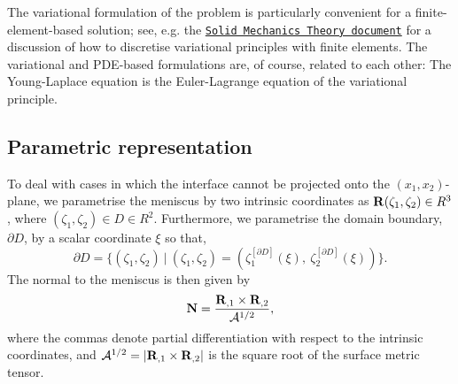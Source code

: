 The variational formulation of the problem is particularly convenient for a finite-\/element-\/based solution; see, e.\+g. the \href{../../../solid/solid_theory/html/index.html#CartesianLagrangian}{\tt Solid Mechanics Theory document} for a discussion of how to discretise variational principles with finite elements. The variational and P\+D\+E-\/based formulations are, of course, related to each other\+: The Young-\/\+Laplace equation is the Euler-\/\+Lagrange equation of the variational principle.\hypertarget{index_intrinsic}{}\subsection{Parametric representation}\label{index_intrinsic}
To deal with cases in which the interface cannot be projected onto the $ (x_1, x_2) $-\/plane, we parametrise the meniscus by two intrinsic coordinates as $ {\bf R}(\zeta_1,\zeta_2) \in { R}^3$, where $(\zeta_1,\zeta_2) \in D \in { R}^2$. Furthermore, we parametrise the domain boundary, $\partial D$, by a scalar coordinate $\xi$ so that, \[ {\partial D} = \bigg\{ (\zeta_1,\zeta_2) \ \bigg| \ (\zeta_1,\zeta_2) = \left( \zeta_1^{[\partial D]}(\xi), \ \zeta_2^{[\partial D]}(\xi) \right) \bigg\}. \] The normal to the meniscus is then given by \[ {\bf N} = \frac{{\bf R}_{,1} \times {\bf R}_{,2} } {\mathcal{A}^{1/2}}, \] where the commas denote partial differentiation with respect to the intrinsic coordinates, and $ \mathcal{A}^{1/2}= |{\bf R}_{,1} \times {\bf R}_{,2}| $ is the square root of the surface metric tensor.

